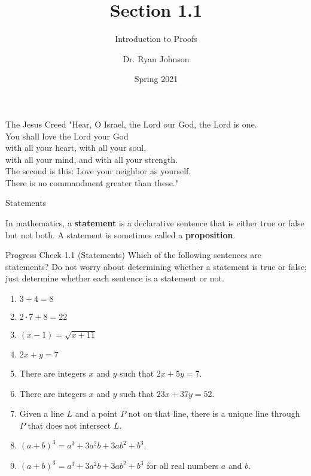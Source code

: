 \documentclass{beamer}
\title{Section 1.1}
\subtitle{Introduction to Proofs}
\author{Dr. Ryan Johnson}
\institute{Grace College}
\date{Spring 2021}
\begin{document}
\begin{frame}[plain]
    \maketitle
\end{frame}

\begin{frame}{The Jesus Creed}
\Large{
"Hear, O Israel, the Lord our God, the Lord is one.\\
You shall love the Lord your God\\
\;\; with all your heart, with all your soul,\\
\;\; with all your mind, and with all your strength.\\
The second is this: Love your neighbor as yourself.\\
There is no commandment greater than these."
}
\end{frame}

\begin{frame}{Statements}
	\begin{definition}
		In mathematics, a \textbf{statement} is a declarative sentence that is either true or false but not both. A statement is sometimes called a \textbf{proposition}.
	\end{definition}
\end{frame}

\begin{frame}{Progress Check 1.1 (Statements)}
	Which of the following sentences are statements? Do not worry about determining
	whether a statement is true or false; just determine whether each sentence is a
	statement or not.
	\begin{enumerate}
		\item \(3 + 4 = 8\)
		\item \(2 \cdot 7 + 8 = 22\)
		\item \( (x-1) = \sqrt{x + 11}\)
		\item \(2x + y = 7\) \pause
		\item There are integers $x$ and $y$ such that $2x + 5y = 7$.
		\item There are integers $x$ and $y$ such that $23x + 37y = 52$.
		\item Given a line $L$ and a point $P$ not on that line, there is a unique line through
		$P$ that does not intersect $L$.
		\item \( (a+b)^3 = a^3 + 3a^2b + 3ab^2 + b^3\).
		\item \( (a+b)^3 = a^3 + 3a^2b + 3ab^2 + b^3\) for all real numbers $a$ and $b$.
	\end{enumerate}
\end{frame}
\end{document}
